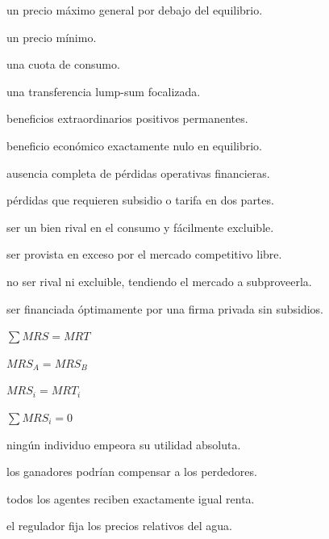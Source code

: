 \begin{opts}
    \item un precio máximo general por debajo del equilibrio.
    \item un precio mínimo.
    \item una cuota de consumo.
    \item una transferencia lump-sum focalizada.
\end{opts}

\begin{opts}
    \item beneficios extraordinarios positivos permanentes.
    \item beneficio económico exactamente nulo en equilibrio.
    \item ausencia completa de pérdidas operativas financieras.
    \item pérdidas que requieren subsidio o tarifa en dos partes.
\end{opts}

\begin{opts}
    \item ser un bien rival en el consumo y fácilmente excluible.
    \item ser provista en exceso por el mercado competitivo libre.
    \item no ser rival ni excluible, tendiendo el mercado a subproveerla.
    \item ser financiada óptimamente por una firma privada sin subsidios.
\end{opts}

\begin{opts}
    \item $\sum MRS = MRT$
    \item $MRS_A = MRS_B$
    \item $MRS_i = MRT_i$
    \item $\sum MRS_i = 0$
\end{opts}

\begin{opts}
    \item ningún individuo empeora su utilidad absoluta.
    \item los ganadores podrían compensar a los perdedores.
    \item todos los agentes reciben exactamente igual renta.
    \item el regulador fija los precios relativos del agua.
\end{opts}

